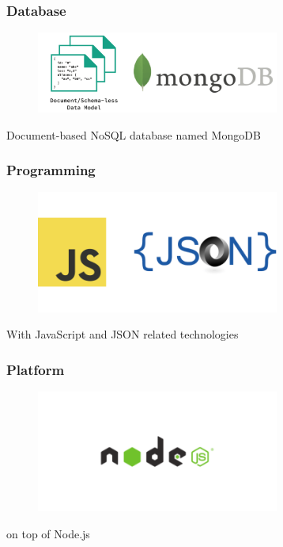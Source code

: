 \documentclass[10pt, compress]{beamer}
\begin{document}

\begin{frame}[fragile]
  \frametitle{Database}
  \centering

  \begin{figure}[ht]
    \includegraphics[width=8cm]{include/literature-database.png}
  \end{figure}

  Document-based \alert{NoSQL} database named \alert{MongoDB}

\end{frame}


\begin{frame}[fragile]
  \frametitle{Programming}
  \centering

  \begin{figure}[ht]
    \includegraphics[width=8cm]{include/literature-programming.png}
  \end{figure}

  With \alert{JavaScript} and \alert{JSON} related technologies

\end{frame}


\begin{frame}[fragile]
  \frametitle{Platform}
  \centering

  \begin{figure}[ht]
    \includegraphics[width=8cm]{include/literature-platform.png}
  \end{figure}

  on top of \alert{Node.js}

\end{frame}
\end{document}
